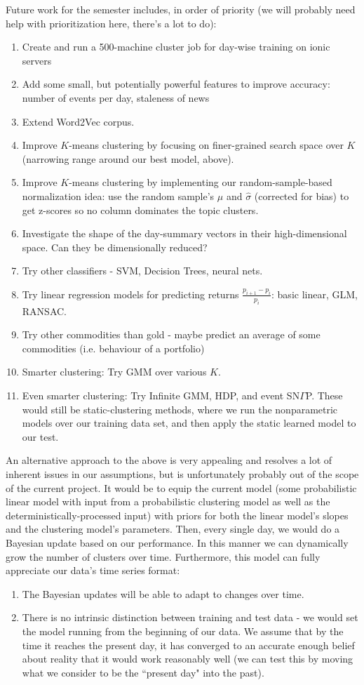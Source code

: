 Future work for the semester includes, in order of priority (we will probably need help with prioritization here, there's a lot to do):
\begin{enumerate}
\item Create and run a 500-machine cluster job for day-wise training on ionic servers
\item Add some small, but potentially powerful features to improve accuracy: number of events per day, staleness of news
\item Extend Word2Vec corpus.
\item Improve $K$-means clustering by focusing on finer-grained search space over $K$ (narrowing range around our best model, above).
\item Improve $K$-means clustering by implementing our random-sample-based normalization idea: use the random sample's $\hat{\mu}$ and $\hat{\sigma}$ (corrected for bias) to get z-scores so no column dominates the topic clusters.
\item Investigate the shape of the day-summary vectors in their high-dimensional space. Can they be dimensionally reduced?
\item Try other classifiers - SVM, Decision Trees, neural nets.
\item Try linear regression models for predicting returns $\frac{p_{i+1}-p_i}{p_i}$: basic linear, GLM, RANSAC.
\item Try other commodities than gold - maybe predict an average of some commodities (i.e. behaviour of a portfolio)
\item Smarter clustering: Try GMM over various $K$.
\item Even smarter clustering: Try Infinite GMM, HDP, and event SN$\Gamma$P. These would still be static-clustering methods, where we run the nonparametric models over our training data set, and then apply the static learned model to our test.
\end{enumerate}

An alternative approach to the above is very appealing and resolves a lot of inherent issues in our assumptions, but is unfortunately probably out of the scope of the current project. It would be to equip the current model (some probabilistic linear model with input from a probabilistic clustering model as well as the deterministically-processed input) with priors for both the linear model's slopes and the clustering model's parameters. Then, every single day, we would do a Bayesian update based on our performance. In this manner we can dynamically grow the number of clusters over time. Furthermore, this model can fully appreciate our data's time series format:
\begin{enumerate}
\item The Bayesian updates will be able to adapt to changes over time.
\item There is no intrinsic distinction between training and test data - we would set the model running from the beginning of our data. We assume that by the time it reaches the present day, it has converged to an accurate enough belief about reality that it would work reasonably well (we can test this by moving what we consider to be the ``present day" into the past).
\end{enumerate}